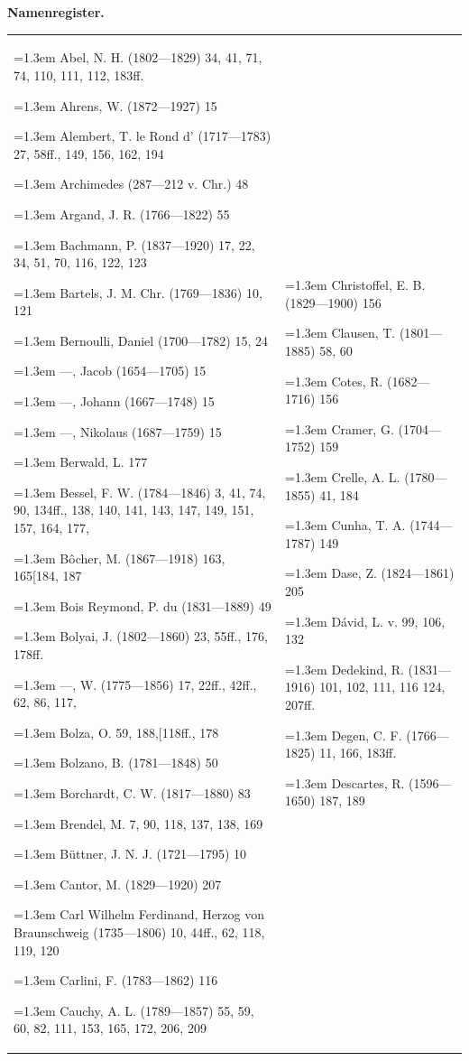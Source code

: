 \par\bigskip
\begin{center}\textbf{Namenregister.}\end{center}
\begingroup
\newcommand{\NI}[1]{\par\noindent\hangindent=1.3em\hangafter=1 #1\par}
\newcommand{\GaussNamenGroup}{\par\vspace{.7\baselineskip}}
\setlength{\tabcolsep}{4pt}
\noindent\begin{tabular}{@{}p{.48\linewidth}|p{.48\linewidth}@{}}
\begin{minipage}[t]{\linewidth}\fontsize{8.2}{10.5}\selectfont\raggedright
\NI{Abel, N. H. (1802—1829) 34, 41, 71, 74, 110, 111, 112, 183ff.}
\NI{Ahrens, W. (1872—1927) 15}
\NI{Alembert, T. le Rond d’ (1717—1783) 27, 58ff., 149, 156, 162, 194}
\NI{Archimedes (287—212 v. Chr.) 48}
\NI{Argand, J. R. (1766—1822) 55}
\GaussNamenGroup
\NI{Bachmann, P. (1837—1920) 17, 22, 34, 51, 70, 116, 122, 123}
\NI{Bartels, J. M. Chr. (1769—1836) 10, 121}
\NI{Bernoulli, Daniel (1700—1782) 15, 24}
\NI{—, Jacob (1654—1705) 15}
\NI{—, Johann (1667—1748) 15}
\NI{—, Nikolaus (1687—1759) 15}
\NI{Berwald, L. 177}
\NI{Bessel, F. W. (1784—1846) 3, 41, 74, 90, 134ff., 138, 140, 141, 143, 147, 149, 151, 157, 164, 177,}
\NI{Bôcher, M. (1867—1918) 163, 165\hfill[184, 187}
\NI{Bois Reymond, P. du (1831—1889) 49}
\NI{Bolyai, J. (1802—1860) 23, 55ff., 176, 178ff.}
\NI{—, W. (1775—1856) 17, 22ff., 42ff., 62, 86, 117,}
\NI{Bolza, O. 59, 188,\hfill[118ff., 178}
\NI{Bolzano, B. (1781—1848) 50}
\NI{Borchardt, C. W. (1817—1880) 83}
\NI{Brendel, M. 7, 90, 118, 137, 138, 169}
\NI{Büttner, J. N. J. (1721—1795) 10}
\GaussNamenGroup
\NI{Cantor, M. (1829—1920) 207}
\NI{Carl Wilhelm Ferdinand, Herzog von Braunschweig (1735—1806) 10, 44ff., 62, 118, 119, 120}
\NI{Carlini, F. (1783—1862) 116}
\NI{Cauchy, A. L. (1789—1857) 55, 59, 60, 82, 111, 153, 165, 172, 206, 209}
\end{minipage}&
\begin{minipage}[t]{\linewidth}\fontsize{8.2}{10.5}\selectfont\raggedright
\NI{Christoffel, E. B. (1829—1900) 156}
\NI{Clausen, T. (1801—1885) 58, 60}
\NI{Cotes, R. (1682—1716) 156}
\NI{Cramer, G. (1704—1752) 159}
\NI{Crelle, A. L. (1780—1855) 41, 184}
\NI{Cunha, T. A. (1744—1787) 149}
\GaussNamenGroup
\NI{Dase, Z. (1824—1861) 205}
\NI{Dávid, L. v. 99, 106, 132}
\NI{Dedekind, R. (1831—1916) 101, 102, 111, 116 124, 207ff.}
\NI{Degen, C. F. (1766—1825) 11, 166, 183ff.}
\NI{Descartes, R. (1596—1650) 187, 189}

\end{minipage}
\end{tabular}
